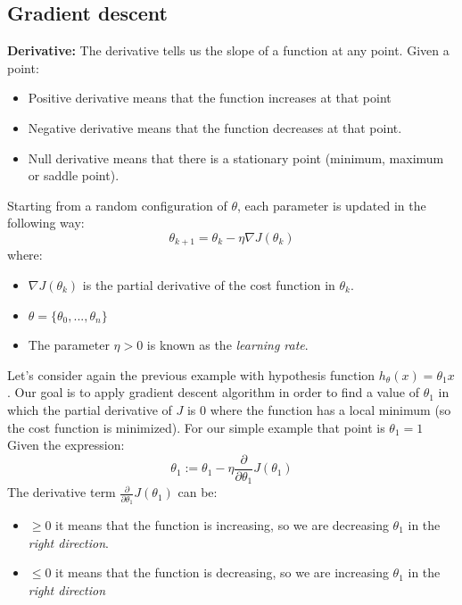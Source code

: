 \subsection{Gradient descent}
\textbf{Derivative:}\newline
The derivative tells us the slope of a function at any point. Given a point:
\begin{itemize}
    \item Positive derivative means that the function increases at that point
    \item Negative derivative means that the function decreases at that point.
    \item Null derivative means that there is a stationary point (minimum, maximum or saddle point).
\end{itemize}
Starting from a random configuration of $\theta$, each parameter is updated in the following way:
\[\theta_{k+1} = \theta_{k} - \eta \nabla J(\theta_{k})\]
where: 
\begin{itemize}
    \item $\nabla J(\theta_{k})$ is the partial derivative of the cost function in $\theta_{k}$.
    \item $\theta = \{\theta_{0},...,\theta_{n}\}$
    \item The parameter $\eta > 0$ is known as the \textit{learning rate}. 
\end{itemize}
Let's consider again the previous example with hypothesis function $h_{\theta}(x) = \theta_{1}x$. Our goal is to apply gradient descent algorithm in order to find a value of $\theta_{1}$ in which the partial derivative of $J$ is 0 where the function has a local minimum (so the cost function is minimized). For our simple example that point is $\theta_{1} = 1$\newline
Given the expression: 
\[\theta_{1} := \theta_{1} - \eta \frac{\partial}{\partial \theta_{1}}J(\theta_{1})\]
The derivative term $\frac{\partial}{\partial \theta_{1}}J(\theta_{1})$ can be:
\begin{itemize}
    \item $\geq 0$ it means that the function is increasing, so we are decreasing $\theta_{1}$ in the \textit{right direction}.
    \item $\leq 0$ it means that the function is decreasing, so we are increasing $\theta_{1}$ in the \textit{right direction}
\end{itemize}
